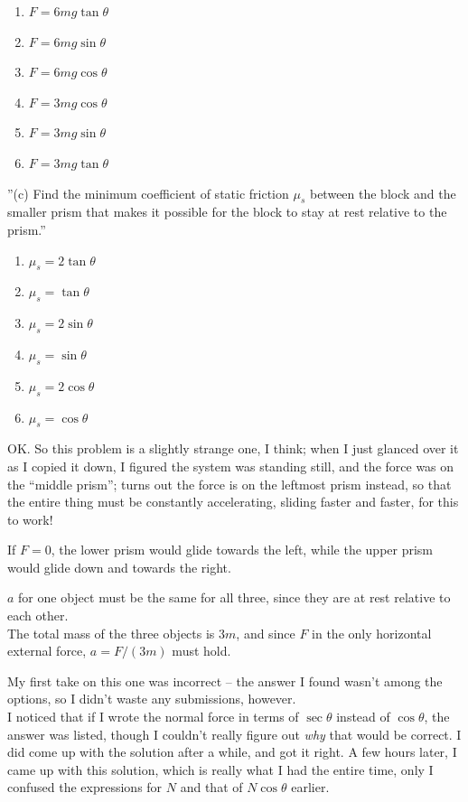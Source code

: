 \documentclass[8.01x]{subfiles}
\begin{document}
\begin{enumerate}
\item $F = 6 m g \tan \theta$
\item $F = 6 m g \sin \theta$
\item $F = 6 m g \cos \theta$
\item $F = 3 m g \cos \theta$
\item $F = 3 m g \sin \theta$
\item $F = 3 m g \tan \theta$
\end{enumerate}

''(c) Find the minimum coefficient of static friction $\mu_s$ between the block and the smaller prism that makes it possible for the block to stay at rest relative to the prism.''

\begin{enumerate}
\item $\mu_s = 2 \tan \theta$
\item $\mu_s = \tan \theta$
\item $\mu_s = 2 \sin \theta$
\item $\mu_s = \sin \theta$
\item $\mu_s = 2 \cos \theta$
\item $\mu_s = \cos \theta$
\end{enumerate}

OK. So this problem is a slightly strange one, I think; when I just glanced over it as I copied it down, I figured the system was standing still, and the force was on the ``middle prism''; turns out the force is on the leftmost prism instead, so that the entire thing must be constantly accelerating, sliding faster and faster, for this to work!

If $F = 0$, the lower prism would glide towards the left, while the upper prism would glide down and towards the right.

$a$ for one object must be the same for all three, since they are at rest relative to each other.\\
The total mass of the three objects is $3m$, and since $F$ in the only horizontal external force, $a = F/(3m)$ must hold.

My first take on this one was incorrect -- the answer I found wasn't among the options, so I didn't waste any submissions, however.\\
I noticed that if I wrote the normal force in terms of $\sec\theta$ instead of $\cos\theta$, the answer was listed, though I couldn't really figure out \emph{why} that would be correct. I did come up with the solution after a while, and got it right. A few hours later, I came up with this solution, which is really what I had the entire time, only I confused the expressions for $N$ and that of $N \cos \theta$ earlier.
\end{document}
